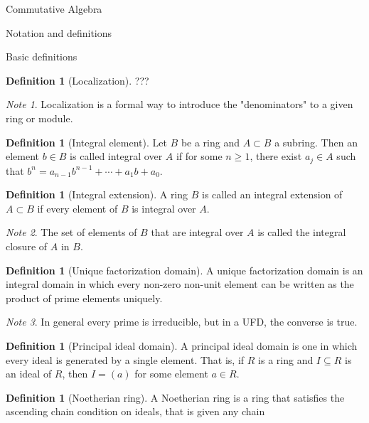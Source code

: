 \documentclass{article}
\theoremstyle{definition}
\numberwithin{theorem}{subsection} %
\theoremstyle{remark}
\newtheorem*{remark}{Note}
\theoremstyle{definition}
\newtheorem{definition}[paragraph]{Definition}
\begin{document}
\begin{section}{Commutative Algebra}
  \begin{subsection}{Notation and definitions}
    \begin{subsubsection}{Basic definitions}
      \begin{definition}[Localization]
        ???
      \end{definition}
      \begin{remark}
        Localization is a formal way to introduce the "denominators" to a
        given ring or module.
      \end{remark}
      \begin{definition}[Integral element]
        Let $B$ be a ring and $A \subset B$ a subring. Then an element $b \in B$
        is called integral over $A$ if for some $n \geq 1$, there exist
        $a_j \in A$ such that $b^n = a_{n-1}b^{n-1} + \cdots + a_1b + a_0$.
      \end{definition}
      \begin{definition}[Integral extension]
        A ring $B$ is called an integral extension of $A \subset B$ if every
        element of $B$ is integral over $A$.
      \end{definition}
      \begin{remark}
        The set of elements of $B$ that are integral over $A$ is called the
        integral closure of $A$ in $B$.
      \end{remark}
      \begin{definition}[Unique factorization domain]
        A unique factorization domain is an integral domain in which every
        non-zero non-unit element can be written as the product of prime
        elements uniquely.
      \end{definition}
      \begin{remark}
        In general every prime is irreducible, but in a UFD, the converse is true.
      \end{remark}
      \begin{definition}[Principal ideal domain]
        A principal ideal domain is one in which every ideal is generated by a
        single element. That is, if $R$ is a ring and $I \subseteq R$ is an
        ideal of $R$, then $I = (a)$ for some element $a \in R$.
      \end{definition}
      \begin{definition}[Noetherian ring]
        A Noetherian ring is a ring that satisfies the ascending chain condition
        on ideals, that is given any chain \[
\]
\end{definition}
\end{subsubsection}
\end{subsection}
\end{section}
\end{document}
